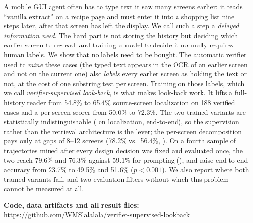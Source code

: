 A mobile GUI agent often has to type text it saw many screens earlier: it reads ``vanilla extract'' on a recipe page and must enter it into a shopping list nine steps later, after that screen has left the display. We call such a step a \emph{delayed information need}. The hard part is not storing the history but deciding which earlier screen to re-read, and training a model to decide it normally requires human labels. We show that no labels need to be bought. The automatic verifier used to \emph{mine} these cases (the typed text appears in the OCR of an earlier screen and not on the current one) also \emph{labels} every earlier screen as holding the text or not, at the cost of one substring test per screen. Training on those labels, which we call \emph{verifier-supervised look-back}, is what makes look-back work. It lifts a full-history reader from 54.8\% to 65.4\% source-screen localization on 188 verified cases and a per-screen scorer from 50.0\% to 72.3\%. The two trained variants are statistically indistinguishable ( on localization,  end-to-end), so the supervision rather than the retrieval architecture is the lever; the per-screen decomposition pays only at gaps of 8--12 screens (78.2\% vs.\ 56.4\%, ). On a fourth sample of trajectories mined after every design decision was fixed and evaluated once, the two reach 79.6\% and 76.3\% against 59.1\% for prompting (), and raise end-to-end accuracy from 23.7\% to 49.5\% and 51.6\% ($p<0.001$). We also report where both trained variants fail, and two evaluation filters without which this problem cannot be measured at all.

\textbf{Code, data artifacts and all result files:} \url{https://github.com/WMSlalalala/verifier-supervised-lookback}

